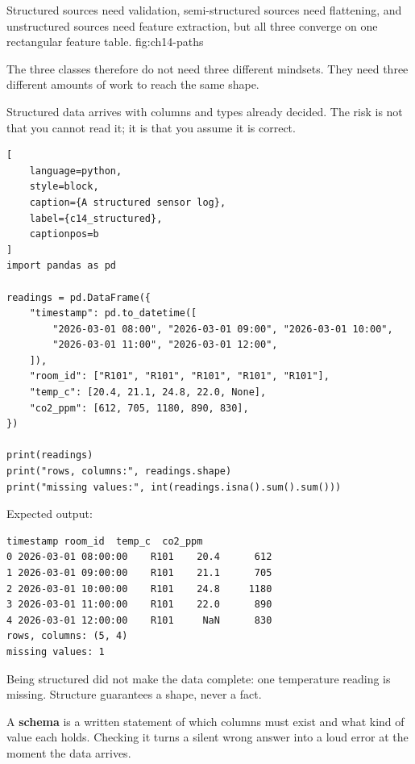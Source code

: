 {Structured sources need validation, semi-structured sources need flattening, and unstructured sources need feature extraction, but all three converge on one rectangular feature table.}
{fig:ch14-paths}

The three classes therefore do not need three different mindsets. They need
three different amounts of work to reach the same shape.


Structured data arrives with columns and types already decided. The risk is not
that you cannot read it; it is that you assume it is correct.

\begin{lstlisting}[
    language=python,
    style=block,
    caption={A structured sensor log},
    label={c14_structured},
    captionpos=b
]
import pandas as pd

readings = pd.DataFrame({
    "timestamp": pd.to_datetime([
        "2026-03-01 08:00", "2026-03-01 09:00", "2026-03-01 10:00",
        "2026-03-01 11:00", "2026-03-01 12:00",
    ]),
    "room_id": ["R101", "R101", "R101", "R101", "R101"],
    "temp_c": [20.4, 21.1, 24.8, 22.0, None],
    "co2_ppm": [612, 705, 1180, 890, 830],
})

print(readings)
print("rows, columns:", readings.shape)
print("missing values:", int(readings.isna().sum().sum()))
\end{lstlisting}

Expected output:

\begin{lstlisting}[language=text, style=block, caption={Clean shape, one gap}, label={c14_structured_output}, captionpos=b]
            timestamp room_id  temp_c  co2_ppm
0 2026-03-01 08:00:00    R101    20.4      612
1 2026-03-01 09:00:00    R101    21.1      705
2 2026-03-01 10:00:00    R101    24.8     1180
3 2026-03-01 11:00:00    R101    22.0      890
4 2026-03-01 12:00:00    R101     NaN      830
rows, columns: (5, 4)
missing values: 1
\end{lstlisting}

Being structured did not make the data complete: one temperature reading is
missing. Structure guarantees a shape, never a fact.


A \textbf{schema} is a written statement of which columns must exist and what
kind of value each holds. Checking it turns a silent wrong answer into a loud
error at the moment the data arrives.

